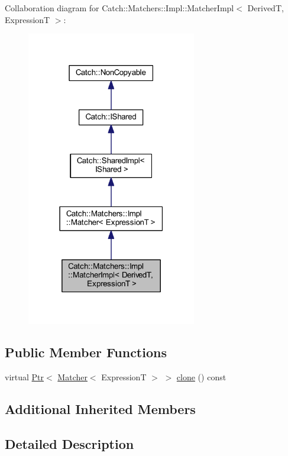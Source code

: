Collaboration diagram for Catch\+:\+:Matchers\+:\+:Impl\+:\+:Matcher\+Impl$<$ DerivedT, ExpressionT $>$\+:\nopagebreak
\begin{figure}[H]
\begin{center}
\leavevmode
\includegraphics[width=210pt]{struct_catch_1_1_matchers_1_1_impl_1_1_matcher_impl__coll__graph}
\end{center}
\end{figure}
\subsection*{Public Member Functions}
\begin{DoxyCompactItemize}
\item 
virtual \hyperlink{class_catch_1_1_ptr}{Ptr}$<$ \hyperlink{struct_catch_1_1_matchers_1_1_impl_1_1_matcher}{Matcher}$<$ ExpressionT $>$ $>$ \hyperlink{struct_catch_1_1_matchers_1_1_impl_1_1_matcher_impl_af7cf4b7b730145d4455dc356490e6b77}{clone} () const
\end{DoxyCompactItemize}
\subsection*{Additional Inherited Members}


\subsection{Detailed Description}
